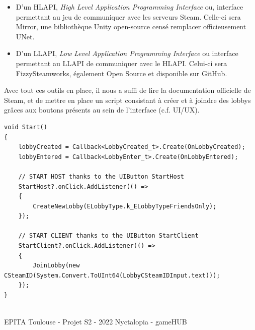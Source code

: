 \begin{itemize}
    \item{ D'un HLAPI, \emph{High Level Application Programming Interface} ou, interface permettant au jeu de communiquer avec les serveurs Steam. Celle-ci sera Mirror, une bibliothèque Unity open-source censé remplacer officieusement UNet.}
    \newline
    \item{ D'un LLAPI, \emph{Low Level Application Programming Interface} ou interface permettant au LLAPI de communiquer avec le HLAPI. Celui-ci sera FizzySteamworks, également Open Source et disponible sur GitHub.}
\end{itemize}

Avec tout ces outils en place, il nous a suffi de lire la documentation officielle de Steam, et de mettre en place un script consistant à créer et à joindre des lobbys grâces aux boutons présents au sein de l'interface (c.f. UI/UX).

\begin{lstlisting}[language={[Sharp]C}, caption={Fonction C\# UILinker}, label={Script}]
void Start()
{
    lobbyCreated = Callback<LobbyCreated_t>.Create(OnLobbyCreated);
    lobbyEntered = Callback<LobbyEnter_t>.Create(OnLobbyEntered);
        
    // START HOST thanks to the UIButton StartHost
    StartHost?.onClick.AddListener(() => 
    {
        CreateNewLobby(ELobbyType.k_ELobbyTypeFriendsOnly);
    });

    // START CLIENT thanks to the UIButton StartClient
    StartClient?.onClick.AddListener(() => 
    {
        JoinLobby(new CSteamID(System.Convert.ToUInt64(LobbyCSteamIDInput.text)));
    });
}
\end{lstlisting}

\vfill
\noindent\makebox[\linewidth]{\rule{.8\paperwidth}{.6pt}}\\[0.2cm]
EPITA Toulouse - Projet S2 - 2022 \hfill Nyctalopia - gameHUB
\noindent\makebox[\linewidth]{\rule{.8\paperwidth}{.6pt}}

